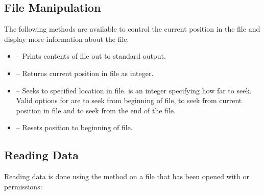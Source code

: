 \documentclass[a4paper,10pt,openany,english]{sphinxmanual}
\begin{document}
\subsection{File Manipulation}
\label{tutorial:id3}
The following methods are available to control the current position in the file and display more information about the file.
\begin{itemize}
\item {} 
 -- Prints contents of file out to standard output.

\item {} 
 -- Returns current position in file as integer.

\item {} 
 -- Seeks to specified location in file.  is an integer specifying how far to seek. Valid options for  are  to seek from beginning of file,  to seek from current position in file and  to seek from the end of the file.

\item {} 
 -- Resets position to beginning of file.

\end{itemize}


\subsection{Reading Data}
\label{tutorial:id4}
Reading data is done using the  method on a file that has been opened with  or  permissions:

\begin{sphinxVerbatim}[commandchars=\\\{\}]
 
  
  
  
\end{sphinxVerbatim}
\end{document}
